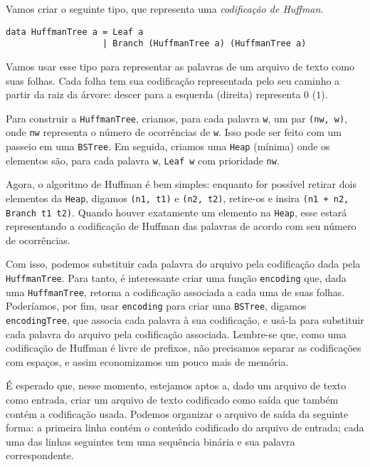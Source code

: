 \documentclass[a4paper]{article}
\begin{document}
Vamos criar o seguinte tipo, que representa uma \emph{codificação de Huffman}.

\begin{verbatim}
data HuffmanTree a = Leaf a
                   | Branch (HuffmanTree a) (HuffmanTree a)
\end{verbatim}

Vamos usar esse tipo para representar as palavras de um arquivo de texto como suas folhas.
Cada folha tem sua codificação representada pelo seu caminho a partir da raiz da árvore:
descer para a esquerda (direita) representa $0$ ($1$).

Para construir a \texttt{HuffmanTree}, criamos, para cada palavra \texttt{w}, um par \texttt{(nw, w)}, onde \texttt{nw} representa o número de ocorrências de \texttt{w}.
Isso pode ser feito com um passeio em uma \texttt{BSTree}.
Em seguida, criamos uma \texttt{Heap} (mínima) onde os elementos são, para cada palavra \texttt{w}, \texttt{Leaf w} com prioridade \texttt{nw}.

Agora, o algoritmo de Huffman é bem simples: enquanto for possível retirar dois elementos da \texttt{Heap}, digamos \texttt{(n1, t1)} e \texttt{(n2, t2)}, retire-os e insira \texttt{(n1 + n2, Branch t1 t2)}.
Quando houver exatamente um elemento na \texttt{Heap}, esse estará representando a codificação de Huffman das palavras de acordo com seu número de ocorrências.

Com isso, podemos substituir cada palavra do arquivo pela codificação dada pela \texttt{HuffmanTree}.
Para tanto, é interessante criar uma função \texttt{encoding} que, dada uma \texttt{HuffmanTree}, retorna a codificação associada a cada uma de suas folhas.
Poderíamos, por fim, usar \texttt{encoding} para criar uma \texttt{BSTree}, digamos \texttt{encodingTree}, que associa cada palavra à sua codificação, e usá-la para substituir cada palavra do arquivo pela codificação associada.
Lembre-se que, como uma codificação de Huffman é livre de prefixos, não precisamos separar as codificações com espaços, e assim economizamos um pouco mais de memória.

É esperado que, nesse momento, estejamos aptos a, dado um arquivo de texto como entrada, criar um arquivo de texto codificado como saída que também contém a codificação usada.
Podemos organizar o arquivo de saída da seguinte forma:
a primeira linha contém o conteúdo codificado do arquivo de entrada;
cada uma das linhas seguintes tem uma sequência binária e sua palavra correspondente.
\end{document}
